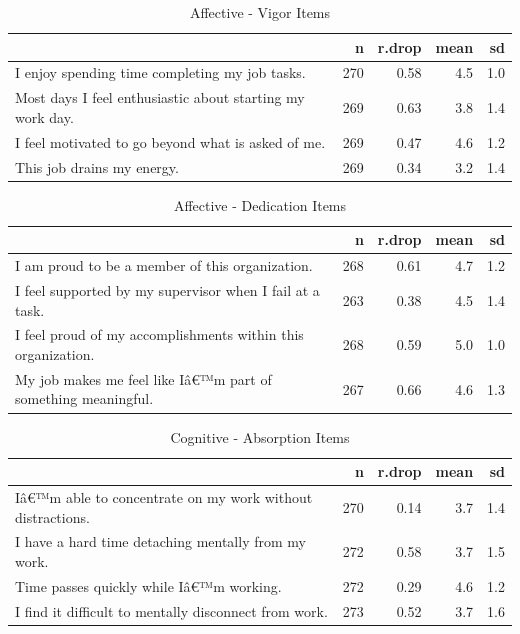 \documentclass[
]{book}
\begin{document}
\begin{table}

\caption{\label{tab:rdrop8}Affective - Vigor Items}
\centering
\begin{tabular}[t]{l|r|r|r|r}
\hline
  & n & r.drop & mean & sd\\
\hline
I enjoy spending time completing my job tasks. & 270 & 0.58 & 4.5 & 1.0\\
\hline
Most days I feel enthusiastic about starting my work day. & 269 & 0.63 & 3.8 & 1.4\\
\hline
I feel motivated to go beyond what is asked of me. & 269 & 0.47 & 4.6 & 1.2\\
\hline
This job drains my energy. & 269 & 0.34 & 3.2 & 1.4\\
\hline
\end{tabular}
\end{table}

\begin{table}

\caption{\label{tab:rdrop9}Affective - Dedication Items}
\centering
\begin{tabular}[t]{l|r|r|r|r}
\hline
  & n & r.drop & mean & sd\\
\hline
I am proud to be a member of this organization. & 268 & 0.61 & 4.7 & 1.2\\
\hline
I feel supported by my supervisor when I fail at a task. & 263 & 0.38 & 4.5 & 1.4\\
\hline
I feel proud of my accomplishments within this organization. & 268 & 0.59 & 5.0 & 1.0\\
\hline
My job makes me feel like Iâ€™m part of something meaningful. & 267 & 0.66 & 4.6 & 1.3\\
\hline
\end{tabular}
\end{table}

\begin{table}

\caption{\label{tab:rdrop10}Cognitive - Absorption Items}
\centering
\begin{tabular}[t]{l|r|r|r|r}
\hline
  & n & r.drop & mean & sd\\
\hline
Iâ€™m able to concentrate on my work without distractions. & 270 & 0.14 & 3.7 & 1.4\\
\hline
I have a hard time detaching mentally from my work. & 272 & 0.58 & 3.7 & 1.5\\
\hline
Time passes quickly while Iâ€™m working. & 272 & 0.29 & 4.6 & 1.2\\
\hline
I find it difficult to mentally disconnect from work. & 273 & 0.52 & 3.7 & 1.6\\
\hline
\end{tabular}
\end{table}
\end{document}

